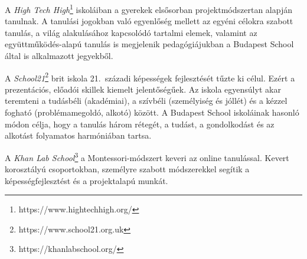 A \emph{High Tech High}\footnote{https://www.hightechhigh.org/} iskoláiban a gyerekek elsősorban projektmódszertan alapján tanulnak. A tanulási jogokban való egyenlőség mellett az egyéni célokra szabott tanulás, a világ alakulásához kapcsolódó tartalmi elemek, valamint az együttműködés-alapú tanulás is megjelenik pedagógiájukban a Budapest School által is alkalmazott jegyekből.

A \emph{School21}\footnote{https://www.school21.org.uk} brit iskola 21.~századi képességek fejlesztését tűzte ki célul. Ezért a prezentációs, előadói skillek kiemelt jelentőségűek. Az iskola egyensúlyt akar teremteni a tudásbéli (akadémiai), a szívbéli (személyiség és jóllét) és a kézzel fogható (problémamegoldó, alkotó) között. A Budapest School iskoláinak hasonló módon célja, hogy a tanulás három rétegét, a tudást, a gondolkodást és az alkotást folyamatos harmóniában tartsa.

A \emph{Khan Lab School}\footnote{https://khanlabschool.org/} a Montessori-módszert keveri az online tanulással. Kevert korosztályú csoportokban, személyre szabott módszerekkel segítik a képességfejlesztést és a projektalapú munkát. 
\newpage
\thispagestyle{empty}
